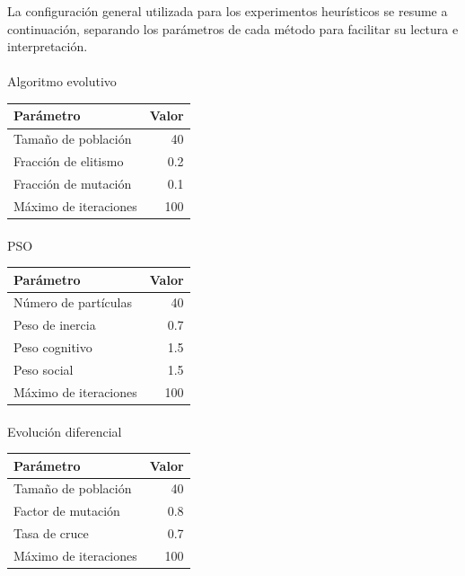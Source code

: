 \documentclass[
  12pt,
  letterpaper,
  DIV=11,
  numbers=noendperiod]{scrartcl}
\makeatletter
\let\oldparagraph\paragraph
\renewcommand{\paragraph}{
    \@ifstar
      \xxxParagraphStar
      \xxxParagraphNoStar
  }
\newcommand{\xxxParagraphStar}[1]{\oldparagraph*{#1}\mbox{}}
\newcommand{\xxxParagraphNoStar}[1]{\oldparagraph{#1}\mbox{}}
\newcounter{none} %
\makeatother
\begin{document}
La configuración general utilizada para los experimentos heurísticos se
resume a continuación, separando los parámetros de cada método para
facilitar su lectura e interpretación.

\paragraph{Algoritmo evolutivo}\label{algoritmo-evolutivo}

{\def\LTcaptype{none} %
\begin{longtable}[]{@{}lr@{}}
\toprule\noalign{}
Parámetro & Valor \\
\midrule\noalign{}
\endhead
\bottomrule\noalign{}
\endlastfoot
Tamaño de población & 40 \\
Fracción de elitismo & 0.2 \\
Fracción de mutación & 0.1 \\
Máximo de iteraciones & 100 \\
\end{longtable}
}

\paragraph{PSO}\label{pso}

{\def\LTcaptype{none} %
\begin{longtable}[]{@{}lr@{}}
\toprule\noalign{}
Parámetro & Valor \\
\midrule\noalign{}
\endhead
\bottomrule\noalign{}
\endlastfoot
Número de partículas & 40 \\
Peso de inercia & 0.7 \\
Peso cognitivo & 1.5 \\
Peso social & 1.5 \\
Máximo de iteraciones & 100 \\
\end{longtable}
}

\paragraph{Evolución diferencial}\label{evoluciuxf3n-diferencial}

{\def\LTcaptype{none} %
\begin{longtable}[]{@{}lr@{}}
\toprule\noalign{}
Parámetro & Valor \\
\midrule\noalign{}
\endhead
\bottomrule\noalign{}
\endlastfoot
Tamaño de población & 40 \\
Factor de mutación & 0.8 \\
Tasa de cruce & 0.7 \\
Máximo de iteraciones & 100 \\
\end{longtable}
}
\end{document}
